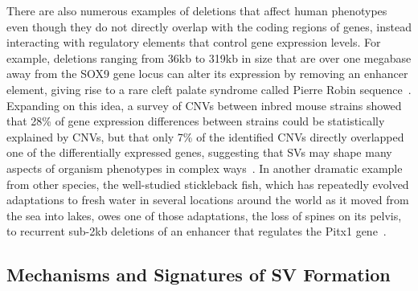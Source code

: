 There are also numerous examples of deletions that affect human phenotypes even though they do not directly overlap with the coding regions of genes, instead interacting with regulatory elements that control gene expression levels. For example, deletions ranging from 36kb to 319kb in size that are over one megabase away from the SOX9 gene locus can alter its expression by removing an enhancer element, giving rise to a rare cleft palate syndrome called Pierre Robin sequence~\cite{Benko:2009dq}. Expanding on this idea, a survey of CNVs between inbred mouse strains showed that 28\% of gene expression differences between strains could be statistically explained by CNVs, but that only 7\% of the identified CNVs directly overlapped one of the differentially expressed genes, suggesting that SVs may shape many aspects of organism phenotypes in complex ways~\cite{Cahan:2009ef}. In another dramatic example from other species, the well-studied stickleback fish, which has repeatedly evolved adaptations to fresh water in several locations around the world as it moved from the sea into lakes, owes one of those adaptations, the loss of spines on its pelvis, to recurrent sub-2kb deletions of an enhancer that regulates the Pitx1 gene~\cite{Chan:2010hz}.


\subsection{Mechanisms and Signatures of SV Formation}

